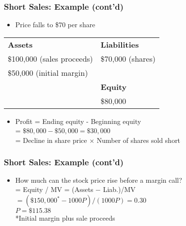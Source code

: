 \documentclass[10pt]{beamer}
\begin{document}
	\begin{frame}
		\frametitle{Short Sales: Example (cont'd)}
		
		\begin{itemize}
			\item Price falls to \$70 per share
		\end{itemize} 
		
		\begin{table}
			\begin{tabular}{ll} 
				\toprule
				\textbf{Assets}				&\textbf{Liabilities}	\\
				\$100,000 (sales proceeds)	&\$70,000 (shares)		\\
				\$50,000 (initial margin)	&						\\
				&\textbf{Equity}		\\
				&\$80,000 				\\
				\bottomrule
			\end{tabular}
		\end{table}
		
		\begin{itemize}
			\item Profit = Ending equity - Beginning equity \\
			= $\$80,000 - \$50,000 = \$30,000$ \\
			= Decline in share price $\times$ Number of shares sold short
			
		\end{itemize}
		
	\end{frame}
	\begin{frame}
		\frametitle{Short Sales: Example (cont'd)}
		
		\begin{itemize}
			\item How much can the stock price rise before a margin call? \\ \smallskip
			= Equity / MV = (Assets $-$ Liab.)/MV  \\
			\smallskip
			$= (\$150,000^* - 1000P)/(1000P) = 0.30$ \\
			\smallskip
			$P = \$ 115.38$ \\
			\smallskip
			*Initial margin plus sale proceeds
			
			
		\end{itemize}
		
	\end{frame}
\end{document}

